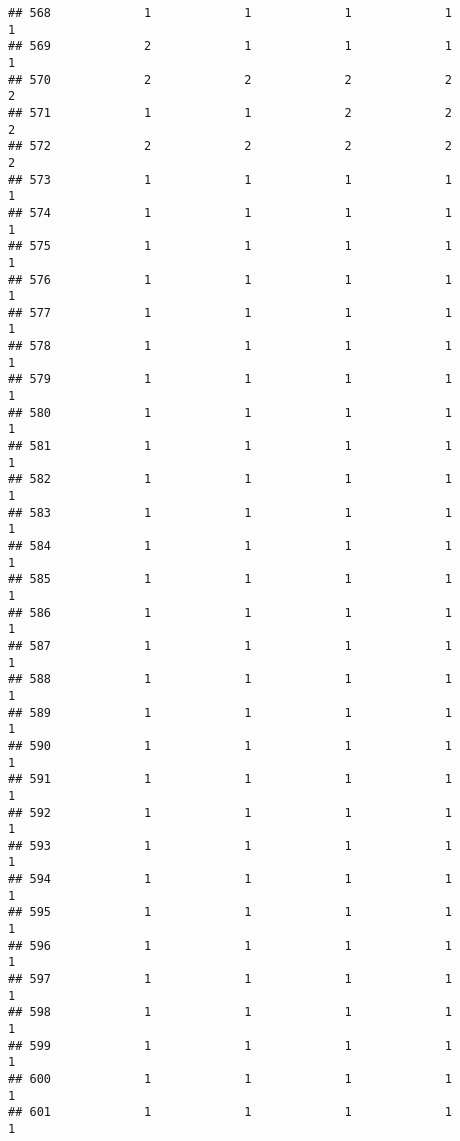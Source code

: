 \documentclass[
]{article}
\begin{document}
\begin{verbatim}
## 568             1             1             1             1             1
## 569             2             1             1             1             1
## 570             2             2             2             2             2
## 571             1             1             2             2             2
## 572             2             2             2             2             2
## 573             1             1             1             1             1
## 574             1             1             1             1             1
## 575             1             1             1             1             1
## 576             1             1             1             1             1
## 577             1             1             1             1             1
## 578             1             1             1             1             1
## 579             1             1             1             1             1
## 580             1             1             1             1             1
## 581             1             1             1             1             1
## 582             1             1             1             1             1
## 583             1             1             1             1             1
## 584             1             1             1             1             1
## 585             1             1             1             1             1
## 586             1             1             1             1             1
## 587             1             1             1             1             1
## 588             1             1             1             1             1
## 589             1             1             1             1             1
## 590             1             1             1             1             1
## 591             1             1             1             1             1
## 592             1             1             1             1             1
## 593             1             1             1             1             1
## 594             1             1             1             1             1
## 595             1             1             1             1             1
## 596             1             1             1             1             1
## 597             1             1             1             1             1
## 598             1             1             1             1             1
## 599             1             1             1             1             1
## 600             1             1             1             1             1
## 601             1             1             1             1             1

\end{verbatim}
\end{document}
